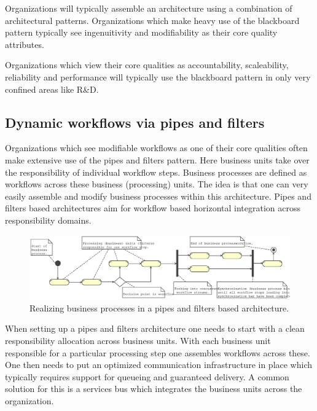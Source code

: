 \documentclass[11pt,english,a4]{article}
\begin{document}
Organizations will typically assemble an architecture using a combination of architectural patterns. Organizations which make heavy use of the blackboard pattern typically see ingenuitivity and modifiability as their core quality attributes.

Organizations which view their core qualities as accountability, scaleability, reliability and performance will typically use the blackboard pattern in only very confined areas like R\&D.

\subsection{Dynamic workflows via pipes and filters}

Organizations which see modifiable workflows as one of their core qualities often make extensive use of the pipes and filters pattern. Here business units take over the responsibility of individual workflow steps. Business processes are defined as workflows across these business (processing) units. The idea is that one can very easily assemble and modify business processes within this architecture. Pipes and filters based architectures aim for workflow based horizontal integration across responsibility domains.

\begin{figure}[hbt]
  \begin{center}%
    \includegraphics[scale=0.4]{pipesAndFiltersExample}
    \caption{Realizing business processes in a pipes and filters based architecture.}
		\label{pipesAndFiltersExample_fig}
  \end{center}
\end{figure}

When setting up a pipes and filters architecture one needs to start with a clean responsibility allocation across business units. With each business unit responsible for a particular processing step one assembles workflows across these. One then needs to put an optimized communication infrastructure in place which typically requires support for queueing and guaranteed delivery. A common solution for this is a services bus which integrates the business units across the organization.
\end{document}
